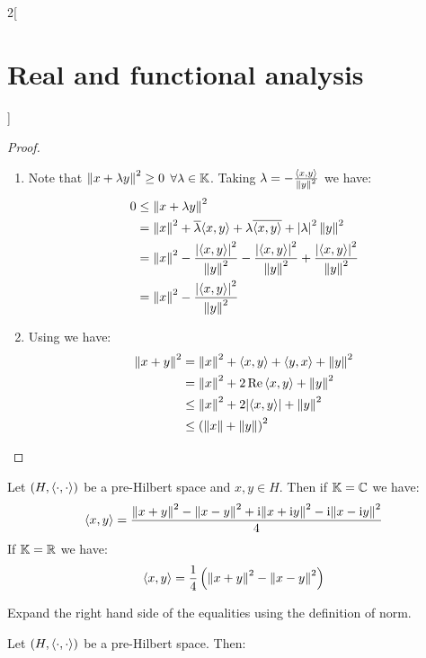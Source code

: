 \documentclass[../../../main_math.tex]{subfiles}
\begin{document}
\begin{multicols}{2}[\section{Real and functional analysis}]
  \begin{proof}
    \begin{enumerate}
      \item Note that $\left\|x+\lambda y\right\|^2\geq 0$ $\forall\lambda\in\mathbb{K}$. Taking $\lambda = -\frac{{\left\langle x,y\right\rangle}}{\left\|y\right\|^2}$ we have:
            \begin{align*}
              0 & \leq \left\|x+\lambda y\right\|^2                                                                                                        \\
                & =\left\|x\right\|^2+\overline{\lambda}{\left\langle x,y\right\rangle}+\lambda\overline{{\left\langle x,y\right\rangle}}+\abs{\lambda}^2\left\|y\right\|^2                                \\
                & =\left\|x\right\|^2-\frac{\abs{{\left\langle x,y\right\rangle}}^2}{\left\|y\right\|^2}-\frac{\abs{{\left\langle x,y\right\rangle}}^2}{\left\|y\right\|^2}+\frac{\abs{{\left\langle x,y\right\rangle}}^2}{\left\|y\right\|^2} \\
                & =\left\|x\right\|^2-\frac{\abs{{\left\langle x,y\right\rangle}}^2}{\left\|y\right\|^2}
            \end{align*}
      \item Using  we have:
            \begin{align*}
              \norm{x+y}^2 & =\norm{x}^2+\dotp{x}{y}+\dotp{y}{x}+\norm{y}^2 \\
                           & =\norm{x}^2+2\Re\dotp{x}{y}+\norm{y}^2         \\
                           & \leq\norm{x}^2+2\abs{\dotp{x}{y}}+\norm{y}^2   \\
                           & \leq{(\norm{x} + \norm{y})}^2
            \end{align*}
    \end{enumerate}
  \end{proof}
  \begin{lemma}\label{RFA:polarization}
    Let $(H,{\left\langle\cdot,\cdot\right\rangle})$ be a pre-Hilbert space and $x,y\in H$. Then if $\mathbb{K}=\mathbb{C}$ we have:
    $${\left\langle x,y\right\rangle}=\frac{{\left\|x+y\right\|}^2-{\left\|x-y\right\|}^2+\mathrm{i}{\left\|x+\mathrm{i} y\right\|}^2-\mathrm{i}{\left\|x-\mathrm{i} y\right\|}^2}{4}$$
    If $\mathbb{K}=\mathbb{R}$ we have:
    $${\left\langle x,y\right\rangle}=\frac{1}{4}\left({\left\|x+y\right\|}^2-{\left\|x-y\right\|}^2\right)$$
  \end{lemma}
  \begin{sproof}
    Expand the right hand side of the equalities using the definition of norm.
  \end{sproof}
  \begin{proposition}
    Let $(H,{\left\langle\cdot,\cdot\right\rangle})$ be a pre-Hilbert space. Then:
    \begin{itemize}

\end{itemize}
\end{proposition}
\end{multicols}
\end{document}

